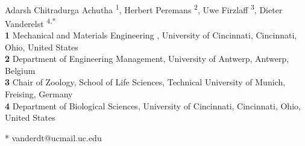 \documentclass[10pt,letterpaper]{article}
\begin{document}
\vspace*{0.2in}

\begin{flushleft}
	{\Large
		\textbf{} %
	}
	\newline
	\\
	Adarsh Chitradurga Achutha \textsuperscript{1},
	Herbert Peremans \textsuperscript{2},
	Uwe Firzlaff \textsuperscript{3},
	Dieter Vanderelst \textsuperscript{4,*}
	\\
	\bigskip
	\textbf{1} Mechanical and Materials Engineering , University of Cincinnati, Cincinnati, Ohio, United States
	\\
	\textbf{2} Department of Engineering Management, University of Antwerp, Antwerp, Belgium
	\\
	\textbf{3} Chair of Zoology, School of Life Sciences, Technical University of Munich, Freising, Germany 
	\\
	\textbf{4} Department of Biological Sciences, University of Cincinnati, Cincinnati, Ohio, United States

	\bigskip
	
	
	
	
	
	
	* vanderdt@ucmail.uc.edu
	
\end{flushleft}
\end{document}
